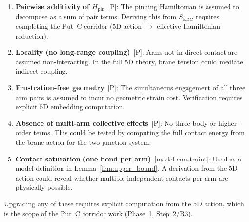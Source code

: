 \begin{enumerate}
    \item \textbf{Pairwise additivity of $H_{\text{pin}}$}~[P]: The pinning
          Hamiltonian is assumed to decompose as a sum of pair terms. Deriving
          this from $S_{\text{EDC}}$ requires completing the Put~C corridor
          (5D action $\to$ effective Hamiltonian reduction).

    \item \textbf{Locality (no long-range coupling)}~[P]: Arms not in direct
          contact are assumed non-interacting. In the full 5D theory, brane
          tension could mediate indirect coupling.

    \item \textbf{Frustration-free geometry}~[P]: The simultaneous engagement
          of all three arm pairs is assumed to incur no geometric strain cost.
          Verification requires explicit 5D embedding computation.

    \item \textbf{Absence of multi-arm collective effects}~[P]: No three-body
          or higher-order terms. This could be tested by computing the full
          contact energy from the brane action for the two-junction system.

    \item \textbf{Contact saturation (one bond per arm)}~[model constraint]:
          Used as a model definition in Lemma~\ref{lem:upper_bound}. A
          derivation from the 5D action could reveal whether multiple
          independent contacts per arm are physically possible.
\end{enumerate}

Upgrading any of these requires explicit computation from the 5D action,
which is the scope of the Put~C corridor work (Phase~1, Step~2/R3).